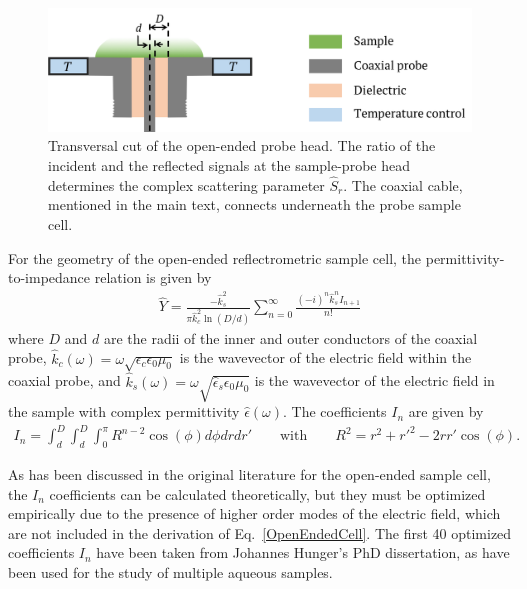 \begin{figure}[t!]
	\centering
	\includegraphics[width=0.8\figwidth]{chapters/Chapter2_Methods/Graphics/SampleCell.png}
	\caption{Transversal cut of the open-ended probe head. The ratio of the incident and the reflected signals at the sample-probe head determines the complex scattering parameter $\hat{S}_r$. The coaxial cable, mentioned in the main text, connects underneath the probe sample cell.}
	\label{SampleCell}
\end{figure}




For the geometry of the open-ended reflectrometric sample cell, the permittivity-to-impedance relation is given by\!\cite{Blackham1997}
\begin{eqnarray}
\hat{Y} = \frac{ - \hat{k}_s^2}{\pi \hat{k}_c^2 \ln (D/d)} \sum_{n=0}^{\infty} \frac{ (-i)^n \hat{k}_s^{n} I_{n+1}}{n !}
\label{OpenEndedCell}
\end{eqnarray}
\noindent where $D$ and $d$ are the radii of the inner and outer conductors of the coaxial probe, $\hat{k}_c (\omega) = \omega \sqrt{\epsilon_c \epsilon_0 \mu_0}$ is the wavevector of the electric field within the coaxial probe, and $\hat{k}_s (\omega) = \omega \sqrt{\hat{\epsilon}_s \epsilon_0 \mu_0}$ is the wavevector of the electric field in the sample with complex permittivity $\hat{\epsilon} (\omega)$. The coefficients $I_n$ are given by
\begin{eqnarray}
I_n = \int_d^D \int_d^D \int_0^\pi R^{n-2} \cos (\phi) d\phi d r d r' \qquad \text{with} \qquad R^2 = r^2 + r'^2 - 2 r r' \cos (\phi).
\end{eqnarray}



As has been discussed in the original literature for the open-ended sample cell,\!\cite{Blackham1997} the $I_n$ coefficients can be calculated theoretically, but they must be optimized empirically due to the presence of higher order modes of the electric field, which are not included in the derivation of Eq.\ \ref{OpenEndedCell}. The first 40 optimized coefficients $I_n$ have been taken from Johannes Hunger's PhD dissertation,\!\cite{HungerThesis} as have been used for the study of multiple aqueous samples.\!\cite{Hunger2009,Tielrooij2010a,Ensing2013,Ottosson2014c,Cota2018,Smit2019}



